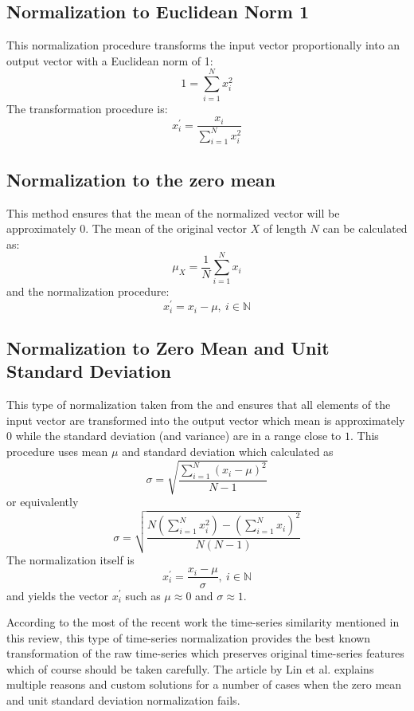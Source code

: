 \subsection{Normalization to Euclidean Norm 1}
This normalization procedure transforms the input vector proportionally into an output vector with a Euclidean norm of 1:
\[
1 = \sum_{i=1}^{N} x_{i}^{2}
\]
The transformation procedure is:
\[
x_{i}^{'} = \frac{ x_{i} }{ \sum_{i=1}^{N} x_{i}^2 }
\]

\subsection{Normalization to the zero mean}
This method ensures that the mean of the normalized vector will be approximately $0$. The mean of the original vector $X$ of length $N$ can be calculated as:
\[
\mu_{X} = \frac{1}{N}\sum_{i=1}^{N}x_{i}
\]
and the normalization procedure:
\[
x_{i}^{'} = x_{i} - \mu, \: i \in \mathbb{N}
\]


\subsection{Normalization to Zero Mean and Unit Standard Deviation}
This type of normalization taken from the \cite{citeulike:3815880} and ensures that all elements of the input vector are transformed into the output vector which mean is approximately $0$ while the standard deviation (and variance) are in a range close to $1$.
This procedure uses mean $\mu$ and standard deviation which calculated as 
\[
\sigma = \sqrt{ \frac{ \sum_{i=1}^{N} (x_{i} - \mu)^{2} }{ N - 1 } }
\]
or equivalently
\[
\sigma = \sqrt{ \frac{
                  N \left( \sum_{i=1}^{N} x_{i}^{2}  \right) - 
                  \left( \sum_{i=1}^{N} x_{i} \right) ^{2}
                }{
                  N(N-1)
                }  
          }
\]
The normalization itself is 
\[
x_{i}^{'} = \frac{x_{i} - \mu}{\sigma}, \: i \in \mathbb{N}
\]
and yields the vector $x_{i}^{'}$ such as $\mu \approx 0$ and $\sigma \approx 1$.

According to the most of the recent work \cite{citeulike:3815880} \cite{citeulike:2821475} \cite{citeulike:3978002} the time-series similarity mentioned in this review, this type of time-series normalization provides the best known transformation of the raw time-series which preserves original time-series features which of course should be taken carefully. The article by Lin et al. \cite{citeulike:2821475} explains multiple reasons and custom solutions for a number of cases when the zero mean and unit standard deviation normalization fails.